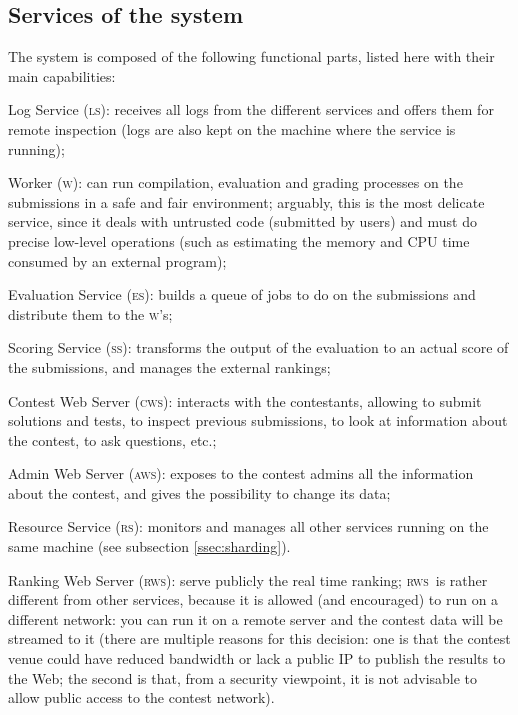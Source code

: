 \documentclass[a4paper,8pt]{amsart}
\newcommand{\LS}{\textsc{ls}}
\newcommand{\ES}{\textsc{es}}
\newcommand{\RS}{\textsc{rs}}
\newcommand{\WS}{\textsc{w}}
\renewcommand{\SS}{\textsc{ss}}
\newcommand{\CWS}{\textsc{cws}}
\newcommand{\AWS}{\textsc{aws}}
\newcommand{\RWS}{\textsc{rws}}
\newenvironment{squishlist}{%
  \begin{list}{\textbullet}%
    { \setlength{\itemsep}{0pt}%
      \setlength{\parsep}{3pt}%
      \setlength{\topsep}{3pt}%
      \setlength{\partopsep}{0pt}%
      \setlength{\leftmargin}{1.5em}%
      \setlength{\labelwidth}{1em}%
      \setlength{\labelsep}{0.5em} }%
}{\end{list}}
\begin{document}
\begin{multicols}{2}
  \subsection{Services of the system}

  The system is composed of the following functional parts, listed
  here with their main capabilities:
  \begin{squishlist}
  \item Log Service (\LS{}): receives all logs from the different
    services and offers them for remote inspection (logs are also kept
    on the machine where the service is running);
  \item Worker (\WS{}): can run compilation, evaluation and grading
    processes on the submissions in a safe and fair environment;
    arguably, this is the most delicate service, since it deals with
    untrusted code (submitted by users) and must do precise low-level
    operations (such as estimating the memory and CPU time consumed by
    an external program);
  \item Evaluation Service (\ES{}): builds a queue of jobs to do on the
    submissions and distribute them to the \WS{}'s;
  \item Scoring Service (\SS{}): transforms the output of the
    evaluation to an actual score of the submissions, and manages the
    external rankings;
  \item Contest Web Server (\CWS{}): interacts with the contestants,
    allowing to submit solutions and tests, to inspect previous
    submissions, to look at information about the contest, to ask
    questions, etc.;
  \item Admin Web Server (\AWS{}): exposes to the contest admins all
    the information about the contest, and gives the possibility to
    change its data;
  \item Resource Service (\RS): monitors and manages all other
    services running on the same machine (see subsection
    \ref{ssec:sharding}).
  \item Ranking Web Server (\RWS{}): serve publicly the real time
    ranking; \RWS\ is rather different from other services, because it
    is allowed (and encouraged) to run on a different network: you can
    run it on a remote server and the contest data will be streamed to
    it (there are multiple reasons for this decision: one is that the
    contest venue could have reduced bandwidth or lack a public IP to
    publish the results to the Web; the second is that, from a
    security viewpoint, it is not advisable to allow public access to
    the contest network).
  \end{squishlist}


\end{multicols}
\end{document}
